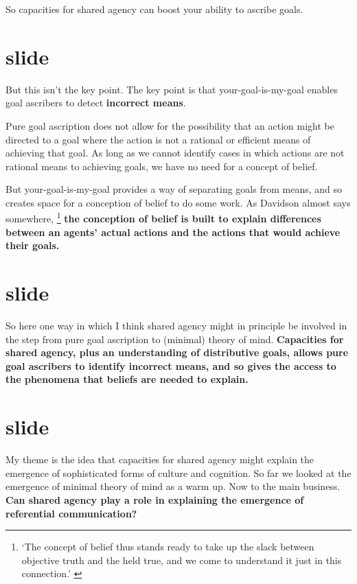 \documentclass[12pt,\papersize]{extarticle}
\begin{document}
So capacities for shared agency can boost your ability to ascribe goals.


\section{slide}
But this isn't the key point.
The key point is that your-goal-is-my-goal enables goal ascribers to detect \textbf{incorrect means}.

Pure goal ascription does not allow for the possibility that an action might be directed to a goal where the action is not a rational or efficient means of achieving that goal.
As long as we cannot identify cases in which actions are not rational means to achieving goals, we have no need for a concept of belief.

But your-goal-is-my-goal provides a way of separating goals from means, and so creates space for a conception of belief to do some work.
As Davidson almost says somewhere,%
\footnote{
`The concept of belief thus stands ready to take up the slack between objective truth and the held true, and we come to understand it just in this connection.' \citep[p.\ 170] {Davidson:1975eq} 
}
%
 \textbf{the conception of belief is built to explain differences between an agents' actual actions and the actions that would achieve their goals.}


\section{slide}
So here one way in which I think shared agency might in principle be involved in the step from pure goal ascription to (minimal) theory of mind.
\textbf{Capacities for shared agency,
plus an understanding of distributive goals,
allows pure goal ascribers to identify incorrect means,
and so gives the access to the phenomena that beliefs are needed to explain.}


\section{slide}
My theme is the idea that capacities for shared agency might explain the emergence of sophisticated forms of culture and cognition.
So far we looked at the  emergence of minimal theory of mind as a warm up.
Now to the main business.
\textbf{Can shared agency play a role in explaining the emergence of referential communication?}










\small

\end{document}
